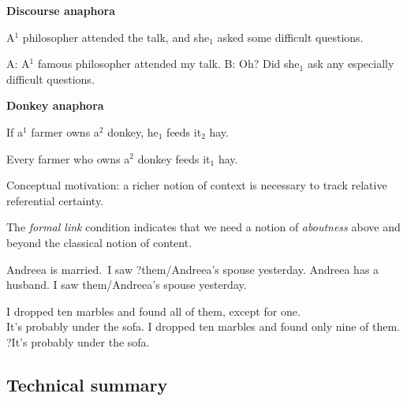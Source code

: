\documentclass[nols,twoside,nofonts,nobib,nohyper]{tufte-handout}
\theoremstyle{observation}
\theoremstyle{theorem}
\theoremstyle{corollary}
\theoremstyle{definition}
\begin{document}
\textbf{Discourse anaphora}

\ex
A$^{1}$ philosopher attended the talk, and she$_{1}$ asked some difficult questions.\label{ex:indef}
\xe

\pex
\a A: A$^{1}$ famous philosopher attended my talk.
\a B: Oh? Did she$_{1}$ ask any especially difficult questions.
\xe

\textbf{Donkey anaphora}

\ex
If a$^{1}$ farmer owns a$^{2}$ donkey, he$_{1}$ feeds it$_{2}$ hay.
\xe

\ex
Every farmer who owns a$^{2}$ donkey feeds it$_{1}$ hay.\label{ex:farmer2}
\xe

Conceptual motivation: a richer notion of context is necessary to track relative referential certainty.

The \textit{formal link} condition indicates that we need a notion of \textit{aboutness} above and beyond the classical notion of content.

\pex
\a Andreea is married. I saw ?them/Andreea's spouse yesterday.\label{ex:fl1}
\a Andreea has a husband. I saw them/Andreea's spouse yesterday.\label{ex:fl2}
\xe

\pex
\a I dropped ten marbles and found all of them, except for one.\\
It's probably under the sofa.
\a I dropped ten marbles and found only nine of them.\\
?It's probably under the sofa.\hfill\citep[p. 21]{Heim1982}
\xe

\subsection{Technical summary}
\end{document}
